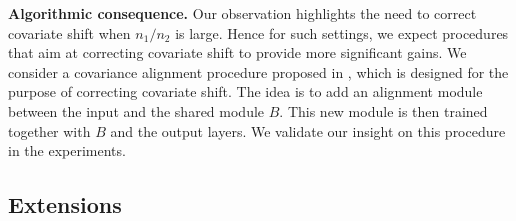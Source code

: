 


\textbf{Algorithmic consequence.}
Our observation highlights the need to correct covariate shift when $n_1 / n_2$ is large.
Hence for such settings, we expect procedures that aim at correcting covariate shift to provide more significant gains.
We consider a covariance alignment procedure proposed in \cite{WZR20}, which is designed for the purpose of correcting covariate shift.
The idea is to add an alignment module between the input and the shared module $B$.
This new module is then trained together with $B$ and the output layers.
We validate our insight on this procedure in the experiments.


\subsection{Extensions}

